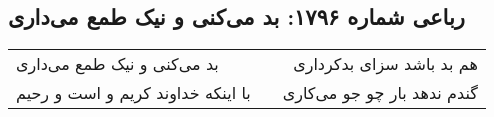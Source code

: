 \begin{center}
\section*{رباعی شماره ۱۷۹۶: بد می‌کنی و نیک طمع می‌داری}
\label{sec:1796}
\begin{longtable}{l p{0.5cm} r}
بد می‌کنی و نیک طمع می‌داری
&&
هم بد باشد سزای بدکرداری
\\
با اینکه خداوند کریم و است و رحیم
&&
گندم ندهد بار چو جو می‌کاری
\\
\end{longtable}
\end{center}

